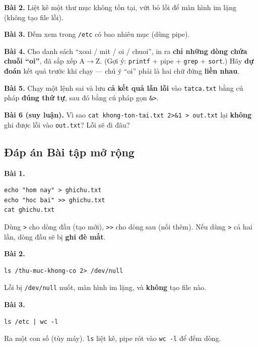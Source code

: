 \documentclass[12pt,a4paper]{article}
\newcommand{\cmd}[1]{\texttt{#1}}
\begin{document}
\textbf{Bài 2.} Liệt kê một thư mục không tồn tại, vứt bỏ lỗi để màn hình im lặng (không tạo file lỗi).

\textbf{Bài 3.} Đếm xem trong \cmd{/etc} có bao nhiêu mục (dùng pipe).

\textbf{Bài 4.} Cho danh sách ``xoai / mit / oi / chuoi'', in ra \textbf{chỉ những dòng chứa chuỗi ``oi''}, đã sắp xếp A$\rightarrow$Z. (Gợi ý: \cmd{printf} + pipe + \cmd{grep} + \cmd{sort}.) Hãy \textbf{dự đoán} kết quả trước khi chạy --- chú ý ``oi'' phải là hai chữ đứng \textbf{liền nhau}.

\textbf{Bài 5.} Chạy một lệnh sai và lưu \textbf{cả kết quả lẫn lỗi} vào \cmd{tatca.txt} bằng cú pháp \textbf{đúng thứ tự}, sau đó bằng cú pháp gọn \cmd{\&>}.

\textbf{Bài 6 (suy luận).} Vì sao \cmd{cat khong-ton-tai.txt 2>\&1 > out.txt} lại \textbf{không} ghi được lỗi vào \cmd{out.txt}? Lỗi sẽ đi đâu?

\subsection{Đáp án Bài tập mở rộng}

\textbf{Bài 1.}
\begin{Verbatim}
echo "hom nay" > ghichu.txt
echo "hoc bai" >> ghichu.txt
cat ghichu.txt
\end{Verbatim}
Dùng \cmd{>} cho dòng đầu (tạo mới), \cmd{>>} cho dòng sau (nối thêm). Nếu dùng \cmd{>} cả hai lần, dòng đầu sẽ bị \textbf{ghi đè mất}.

\textbf{Bài 2.}
\begin{Verbatim}
ls /thu-muc-khong-co 2> /dev/null
\end{Verbatim}
Lỗi bị \cmd{/dev/null} nuốt, màn hình im lặng, và \textbf{không} tạo file nào.

\textbf{Bài 3.}
\begin{Verbatim}
ls /etc | wc -l
\end{Verbatim}
Ra một con số (tùy máy). \cmd{ls} liệt kê, pipe rót vào \cmd{wc -l} để đếm dòng.
\end{document}
